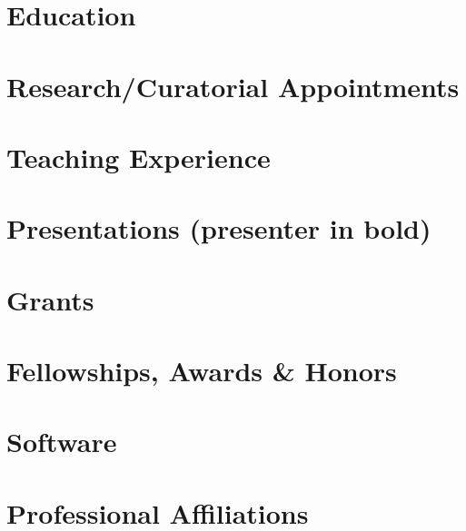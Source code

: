 

\newcommand{\docTitle}{Curriculum Vitae\xspace}


\singlespacing



\section*{Education}


\section*{Research/Curatorial Appointments}


\section*{Teaching Experience}


\nocite{*}
\printbibliography

\section*{Presentations (presenter in bold)}


\section*{Grants}


\section*{Fellowships, Awards \& Honors}


\section*{Software}


\section*{Professional Affiliations}


